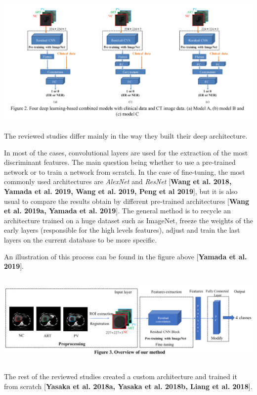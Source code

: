 \documentclass[]{article}
\begin{document}
\includegraphics[width=5.60113in,height=2.56796in]{./images/image5.png}

The reviewed studies differ mainly in the way they built their deep
architecture.

In most of the cases, convolutional layers are used for the extraction
of the most discriminant features. The main question being whether to
use a pre-trained network or to train a network from scratch. In the
case of fine-tuning, the most commonly used architectures are
\emph{AlexNet} and \emph{ResNet} {[}\textbf{Wang et al. 2018, Yamada et
al. 2019, Wang et al. 2019, Peng et al 2019}{]}, but it is also usual to
compare the results obtain by different pre-trained architectures
{[}\textbf{Wang et al. 2019a, Yamada et al. 2019}{]}. The general method
is to recycle an architecture trained on a huge dataset such as
ImageNet, freeze the weights of the early layers (responsible for the
high levels features), adjust and train the last layers on the current
database to be more specific.

An illustration of this process can be found in the figure above
{[}\textbf{Yamada et al. 2019}{]}.

\includegraphics[width=6.26772in,height=1.77778in]{./images/image6.png}

The rest of the reviewed studies created a custom architecture and
trained it from scratch {[}\textbf{Yasaka et al. 2018a, Yasaka et al.
2018b, Liang et al. 2018}{]}.
\end{document}
